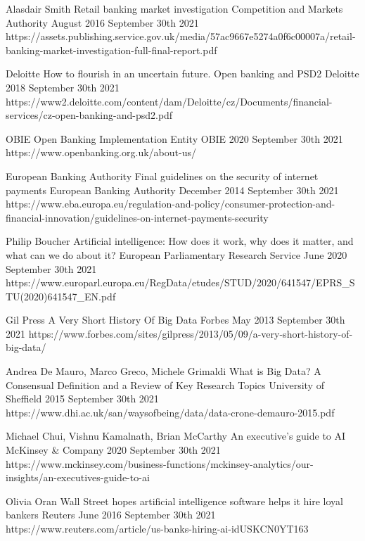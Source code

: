 \begin{thebibliography}{100}
{Alasdair Smith}
{Retail banking market investigation}
{Competition and Markets Authority}
{August 2016}
{September 30th 2021}
{https://assets.publishing.service.gov.uk/media/57ac9667e5274a0f6c00007a/retail-banking-market-investigation-full-final-report.pdf}

{Deloitte}
{How to flourish in an uncertain future. Open banking and PSD2}
{Deloitte}
{2018}
{September 30th 2021}
{https://www2.deloitte.com/content/dam/Deloitte/cz/Documents/financial-services/cz-open-banking-and-psd2.pdf}

{OBIE}
{Open Banking Implementation Entity}
{OBIE}
{2020}
{September 30th 2021}
{https://www.openbanking.org.uk/about-us/}

{European Banking Authority}
{Final guidelines on the security of internet payments}
{European Banking Authority}
{December 2014}
{September 30th 2021}
{https://www.eba.europa.eu/regulation-and-policy/consumer-protection-and-financial-innovation/guidelines-on-internet-payments-security}

{Philip Boucher}
{Artificial intelligence: How does it work, why does it matter, and what can we do about it?}
{European Parliamentary Research Service}
{June 2020}
{September 30th 2021}
{https://www.europarl.europa.eu/RegData/etudes/STUD/2020/641547/EPRS\_STU(2020)641547\_EN.pdf}

{Gil Press}
{A Very Short History Of Big Data}
{Forbes}
{May 2013}
{September 30th 2021}
{https://www.forbes.com/sites/gilpress/2013/05/09/a-very-short-history-of-big-data/}

{Andrea De Mauro, Marco Greco, Michele Grimaldi}
{What is Big Data? A Consensual Definition and a Review of Key Research Topics}
{University of Sheffield}
{2015}
{September 30th 2021}
{https://www.dhi.ac.uk/san/waysofbeing/data/data-crone-demauro-2015.pdf}

{Michael Chui, Vishnu Kamalnath, Brian McCarthy}
{An executive’s guide to AI}
{McKinsey \& Company}
{2020}
{September 30th 2021}
{https://www.mckinsey.com/business-functions/mckinsey-analytics/our-insights/an-executives-guide-to-ai}

{Olivia Oran}
{Wall Street hopes artificial intelligence software helps it hire loyal bankers}
{Reuters}
{June 2016}
{September 30th 2021}
{https://www.reuters.com/article/us-banks-hiring-ai-idUSKCN0YT163}


\end{thebibliography}
